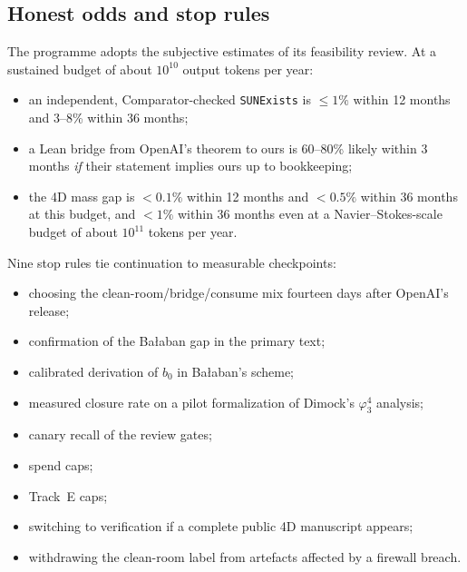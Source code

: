\documentclass[11pt]{article}
\theoremstyle{definition}
\theoremstyle{remark}
\newcommand{\lean}[1]{\texttt{\hyphenchar\font=-1\relax #1}}
\begin{document}
\subsection{Honest odds and stop rules}
The programme adopts the subjective estimates of its feasibility review. At a sustained budget
of about $10^{10}$ output tokens per year:
\begin{itemize}[leftmargin=*]
\item an independent, Comparator-checked \lean{SUNExists} is $\le1\%$ within 12 months and
  3--8\% within 36 months;
\item a Lean bridge from OpenAI's theorem to ours is 60--80\% likely within 3 months
  \emph{if} their statement implies ours up to bookkeeping;
\item the 4D mass gap is $<0.1\%$ within 12 months and $<0.5\%$ within 36 months at this budget,
  and $<1\%$ within 36 months even at a Navier--Stokes-scale budget of about $10^{11}$ tokens per
  year.
\end{itemize}
Nine stop rules tie continuation to measurable checkpoints:
\begin{itemize}[leftmargin=*]
\item choosing the clean-room/bridge/consume mix fourteen days after OpenAI's release;
\item confirmation of the Ba{\l}aban gap in the primary text;
\item calibrated derivation of $b_0$ in Ba{\l}aban's scheme;
\item measured closure rate on a pilot formalization of Dimock's $\varphi^4_3$ analysis;
\item canary recall of the review gates;
\item spend caps;
\item Track~E caps;
\item switching to verification if a complete public 4D manuscript appears;
\item withdrawing the clean-room label from artefacts affected by a firewall breach.
\end{itemize}
\end{document}
